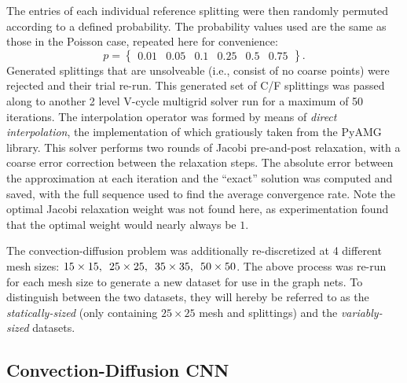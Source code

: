 \documentclass{siamart190516}
\begin{document}
The entries of each individual reference splitting were then randomly permuted according to a defined probability.  The probability values used are the same as those in the Poisson case, repeated here for convenience:
%
\begin{equation} \label{eqn:conv_probabilities}
  p = \begin{Bmatrix} 0.01 & 0.05 & 0.1 & 0.25 & 0.5 & 0.75 \end{Bmatrix}.
\end{equation}
%
Generated splittings that are unsolveable (i.e., consist of no coarse points) were rejected and their trial re-run.  This generated set of C/F splittings was passed along to another 2 level V-cycle multigrid solver run for a maximum of 50 iterations.  The interpolation operator was formed by means of \textit{direct interpolation}, the implementation of which gratiously taken from the PyAMG\cite{pyamg} library.  This solver performs two rounds of Jacobi pre-and-post relaxation, with a coarse error correction between the relaxation steps.  The absolute error between the approximation at each iteration and the ``exact'' solution was computed and saved, with the full sequence used to find the average convergence rate.  Note the optimal Jacobi relaxation weight was not found here, as experimentation found that the optimal weight would nearly always be $1$.

The convection-diffusion problem was additionally re-discretized at 4 different mesh sizes: $15\times 15,\enskip 25\times 25,\enskip 35\times 35,\enskip 50\times 50$.  The above process was re-run for each mesh size to generate a new dataset for use in the graph nets.  To distinguish between the two datasets, they will hereby be referred to as the \textit{statically-sized} (only containing $25 \times 25$ mesh and splittings) and the \textit{variably-sized} datasets.

\subsection{Convection-Diffusion CNN}\label{subsec:conv_cnn}
\end{document}
